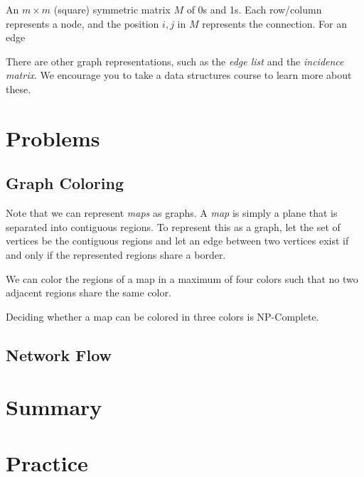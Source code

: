 \documentclass[main.tex]{subfiles}
\begin{document}
\begin{defn}
	An \(m \times m\) (square) symmetric matrix \(M\) of 0s and 1s. Each row/column represents a node, and the position \(i,j\) in \(M\) represents the connection. For an edge 
\end{defn}

\begin{defn}
	
\end{defn}

There are other graph representations, such as the \textit{edge list} and the \textit{incidence matrix}. We encourage you to take a data structures course to learn more about these.

\section{Problems}

\subsection{Graph Coloring}

Note that we can represent \textit{maps} as graphs.
A \textit{map} is simply a plane that is separated into contiguous regions.
To represent this as a graph, let the set of vertices be the contiguous regions and let an edge between two vertices exist if and only if the represented regions share a border.

\begin{thm}
	We can color the regions of a map in a maximum of four colors such that no two adjacent regions share the same color.
\end{thm}

\begin{rem}
	Deciding whether a map can be colored in three colors is NP-Complete.
\end{rem}

\subsection{Network Flow}


\section{Summary}

\section{Practice}
\end{document}
